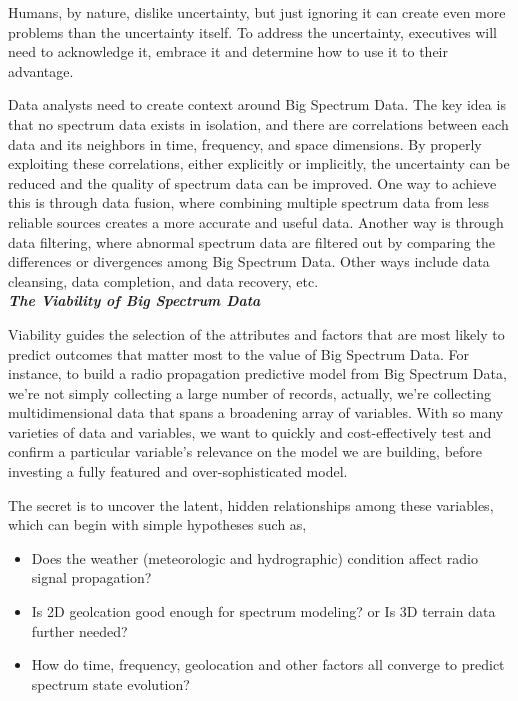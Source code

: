 \documentclass[12pt,draftcls,journal,letterpaper,oneside,onecolumn]{IEEEtran}
\begin{document}
Humans, by nature, dislike uncertainty, but just ignoring it can create even more problems than the uncertainty itself. To address the uncertainty, executives will need to acknowledge it, embrace it and determine how to use it to their advantage.

Data analysts need to create context around Big Spectrum Data. The key idea is that no spectrum data exists in isolation, and there are correlations between each data and its neighbors in time, frequency, and space dimensions. By properly exploiting these correlations, either explicitly or implicitly, the uncertainty can be reduced and the quality of spectrum data can be improved. One way to achieve this is through data fusion, where combining multiple spectrum data from less reliable sources creates a more accurate and useful data. Another way is through data filtering, where abnormal spectrum data are filtered out by comparing the differences or divergences among Big Spectrum Data. Other ways include data cleansing, data completion, and data recovery, etc.
\\
















\textbf{\emph{The Viability of Big Spectrum Data}}

Viability guides the selection of the attributes and factors that are most likely to predict outcomes that matter most to the value of Big Spectrum Data. For instance, to build a radio propagation predictive model from Big Spectrum Data, we're not simply collecting a large number of records, actually, we're collecting multidimensional data that spans a broadening array of variables. With so many varieties of data and variables, we want to quickly and cost-effectively test and confirm a particular variable's relevance on the model we are building, before investing a fully featured and over-sophisticated model.

The secret is to uncover the latent, hidden relationships among these variables, which can begin with simple hypotheses such as,
  \begin{itemize}
    \item Does the weather (meteorologic and hydrographic) condition affect radio signal propagation?
    \item Is 2D geolcation good enough for spectrum modeling? or Is 3D terrain data further needed?
    \item How do time, frequency, geolocation and other factors all converge to predict spectrum state evolution?
  \end{itemize}
\end{document}
